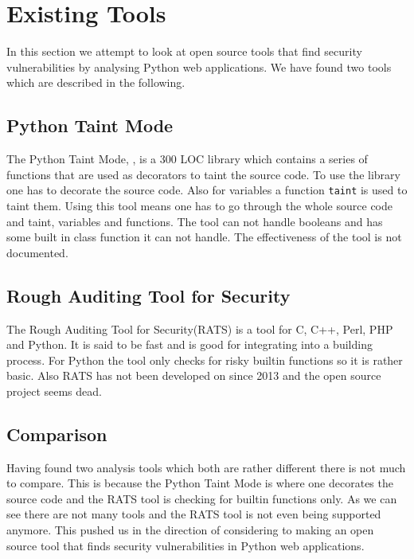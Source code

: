 \section{Existing Tools}
In this section we attempt to look at open source tools that find security vulnerabilities by analysing Python web applications.
We have found two tools which are described in the following.

\subsection{Python Taint Mode}
The Python Taint Mode, \citet{conti2010taint}, is a 300 LOC library which contains a series of functions that are used as decorators to taint the source code.
To use the library one has to decorate the source code.
Also for variables a function \texttt{taint} is used to taint them.
Using this tool means one has to go through the whole source code and taint, variables and functions.
The tool can not handle booleans and has some built in class function it can not handle.
The effectiveness of the tool is not documented.

\subsection{Rough Auditing Tool for Security}
The Rough Auditing Tool for Security(RATS)\cite{rats} is a tool for C, C++, Perl, PHP and Python.
It is said to be fast and is good for integrating into a building process.
For Python the tool only checks for risky builtin functions so it is rather basic.
Also RATS has not been developed on since 2013 and the open source project seems dead.

\subsection{Comparison}
Having found two analysis tools which both are rather different there is not much to compare.
This is because the Python Taint Mode is where one decorates the source code and the RATS tool is checking for builtin functions only.
As we can see there are not many tools and the RATS tool is not even being supported anymore.
This pushed us in the direction of considering to making an open source tool that finds security vulnerabilities in Python web applications.

